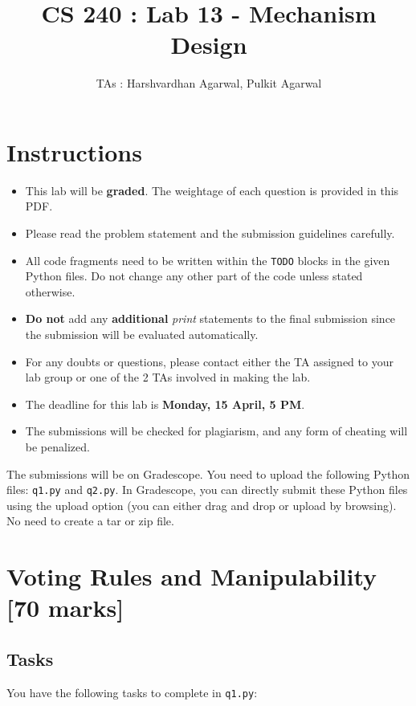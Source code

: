 \documentclass[12pt]{article}
\title{CS 240 : Lab 13 - Mechanism Design}
\author{TAs : Harshvardhan Agarwal, Pulkit Agarwal}
\date{}
\begin{document}
\maketitle

\section*{Instructions}

\begin{itemize}
    \item This lab will be \textbf{graded}. The weightage of each question is provided in this PDF.
    \item Please read the problem statement and the submission guidelines carefully.
    \item All code fragments need to be written within the \texttt{TODO} blocks in the given Python files. Do not change any other part of the code unless stated otherwise.
    \item \textbf{Do not} add any \textbf{additional} \textit{print} statements to the final submission since the submission will be evaluated automatically.
    \item For any doubts or questions, please contact either the TA assigned to your lab group or one of the 2 TAs involved in making the lab.
    \item The deadline for this lab is \textbf{Monday, 15 April, 5 PM}.
    \item The submissions will be checked for plagiarism, and any form of cheating will be penalized.
\end{itemize}

\noindent The submissions will be on Gradescope. You need to upload the following Python files: \verb|q1.py| and \verb|q2.py|. In Gradescope, you can directly submit these Python files using the upload option (you can either drag and drop or upload by browsing). No need to create a tar or zip file. 



\newpage
\section{Voting Rules and Manipulability \hfill [70 marks]}

\subsection{Tasks}
You have the following tasks to complete in \verb|q1.py|:
\end{document}
